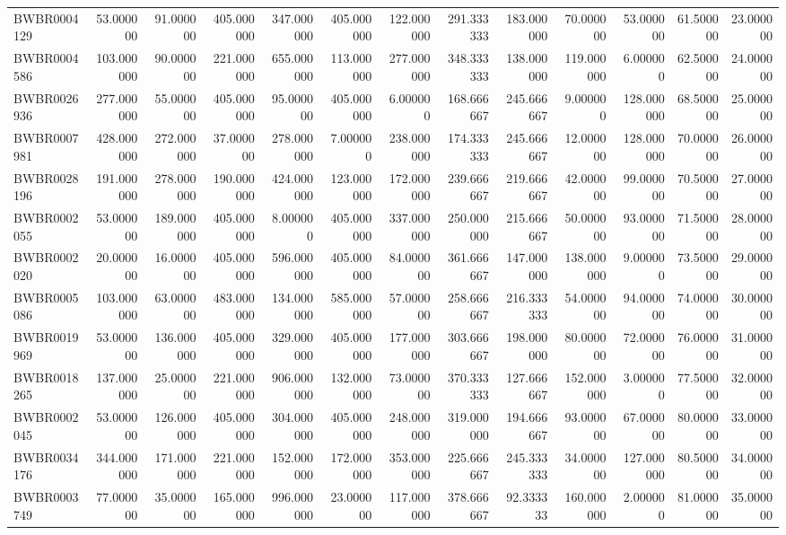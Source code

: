 \begin{longtable}{lrrrrrrrrrrrr}
BWBR0004129 & 53.000000 & 91.000000 & 405.000000 & 347.000000 & 405.000000 & 122.000000 & 291.333333 & 183.000000 & 70.000000 & 53.000000 & 61.500000 & 23.000000 \\
BWBR0004586 & 103.000000 & 90.000000 & 221.000000 & 655.000000 & 113.000000 & 277.000000 & 348.333333 & 138.000000 & 119.000000 & 6.000000 & 62.500000 & 24.000000 \\
BWBR0026936 & 277.000000 & 55.000000 & 405.000000 & 95.000000 & 405.000000 & 6.000000 & 168.666667 & 245.666667 & 9.000000 & 128.000000 & 68.500000 & 25.000000 \\
BWBR0007981 & 428.000000 & 272.000000 & 37.000000 & 278.000000 & 7.000000 & 238.000000 & 174.333333 & 245.666667 & 12.000000 & 128.000000 & 70.000000 & 26.000000 \\
BWBR0028196 & 191.000000 & 278.000000 & 190.000000 & 424.000000 & 123.000000 & 172.000000 & 239.666667 & 219.666667 & 42.000000 & 99.000000 & 70.500000 & 27.000000 \\
BWBR0002055 & 53.000000 & 189.000000 & 405.000000 & 8.000000 & 405.000000 & 337.000000 & 250.000000 & 215.666667 & 50.000000 & 93.000000 & 71.500000 & 28.000000 \\
BWBR0002020 & 20.000000 & 16.000000 & 405.000000 & 596.000000 & 405.000000 & 84.000000 & 361.666667 & 147.000000 & 138.000000 & 9.000000 & 73.500000 & 29.000000 \\
BWBR0005086 & 103.000000 & 63.000000 & 483.000000 & 134.000000 & 585.000000 & 57.000000 & 258.666667 & 216.333333 & 54.000000 & 94.000000 & 74.000000 & 30.000000 \\
BWBR0019969 & 53.000000 & 136.000000 & 405.000000 & 329.000000 & 405.000000 & 177.000000 & 303.666667 & 198.000000 & 80.000000 & 72.000000 & 76.000000 & 31.000000 \\
BWBR0018265 & 137.000000 & 25.000000 & 221.000000 & 906.000000 & 132.000000 & 73.000000 & 370.333333 & 127.666667 & 152.000000 & 3.000000 & 77.500000 & 32.000000 \\
BWBR0002045 & 53.000000 & 126.000000 & 405.000000 & 304.000000 & 405.000000 & 248.000000 & 319.000000 & 194.666667 & 93.000000 & 67.000000 & 80.000000 & 33.000000 \\
BWBR0034176 & 344.000000 & 171.000000 & 221.000000 & 152.000000 & 172.000000 & 353.000000 & 225.666667 & 245.333333 & 34.000000 & 127.000000 & 80.500000 & 34.000000 \\
BWBR0003749 & 77.000000 & 35.000000 & 165.000000 & 996.000000 & 23.000000 & 117.000000 & 378.666667 & 92.333333 & 160.000000 & 2.000000 & 81.000000 & 35.000000 \\

\end{longtable}

